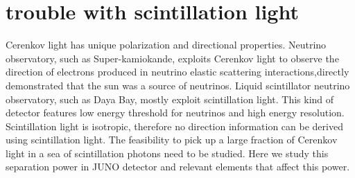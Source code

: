 \documentclass[a4paper,10pt]{cpc-hepnp}
\begin{document}
\section{trouble with scintillation light}
Cerenkov light has unique polarization and directional properties.
Neutrino observatory, such as Super-kamiokande, exploits Cerenkov
light to observe the direction of electrons produced in neutrino
elastic scattering interactions,directly demonstrated that the sun was a source of neutrinos.
Liquid scintillator neutrino observatory, such as Daya Bay, mostly exploit scintillation light.
 This kind of detector features low energy threshold for neutrinos and high energy resolution.
Scintillation light is isotropic, therefore no direction information can be
derived using scintillation light. The feasibility to pick up
a large fraction of Cerenkov light in a sea of scintillation photons
need to be studied.
Here we study this separation power in JUNO detector and relevant elements that affect this power.
\end{document}
